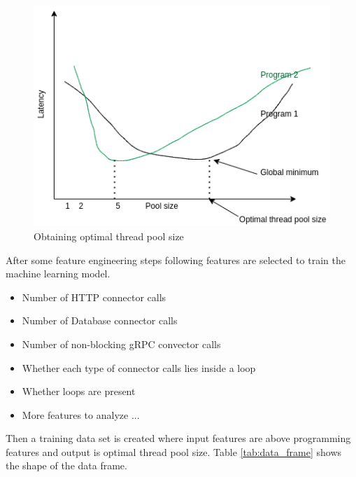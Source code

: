 \begin{figure}[htbp]
	\begin{center}
		\includegraphics[scale=0.5]{figures/optimal_pool_size.png}
	\end{center}
	\caption{Obtaining optimal thread pool size}
	\label{optimal_pool_size}
\end{figure}

After some feature engineering steps following features are selected to train the machine learning model.

 \begin{itemize}
 	\item Number of HTTP connector calls
 	\item Number of Database connector calls
 	\item Number of non-blocking gRPC convector calls
 	\item Whether each type of connector calls lies inside a loop 
 	\item Whether loops are present
 	\item More features to analyze ...
 \end{itemize} 

Then a training data set is created where input features are above programming features and output is optimal thread pool size. Table \ref{tab:data_frame} shows the shape of the data frame.


